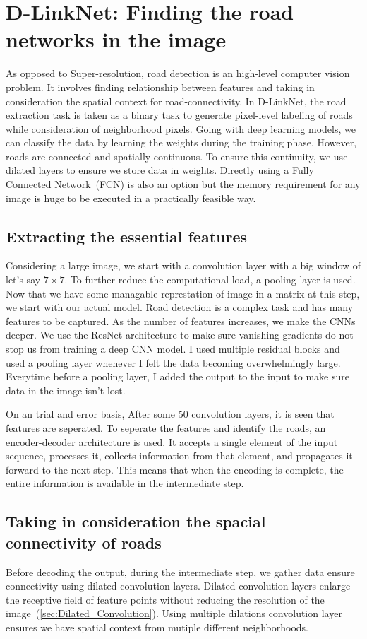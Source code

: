 \section{D-LinkNet: Finding the road networks in the image}
As opposed to Super-resolution, road detection is an high-level computer vision problem. It involves finding relationship between features and taking in consideration the spatial context for road-connectivity. In D-LinkNet, the road extraction task is taken as a binary task to generate pixel-level labeling of roads while consideration of neighborhood pixels. Going with deep learning models, we can classify the data by learning the weights during the training phase. However, roads are connected and spatially continuous. To ensure this continuity, we use dilated layers to ensure we store data in weights. Directly using a Fully Connected Network~(FCN) is also an option but the memory requirement for any image is huge to be executed in a practically feasible way.

\subsection{Extracting the essential features}
Considering a large image, we start with a convolution layer with a big window of let's say $7\times7$. To further reduce the computational load, a pooling layer is used. Now that we have some managable represtation of image in a matrix at this step, we start with our actual model. Road detection is a complex task and has many features to be captured. As the number of features increases, we make the CNNs deeper. We use the ResNet architecture to make sure vanishing gradients do not stop us from training a deep CNN model. I used multiple residual blocks and used a pooling layer whenever I felt the data becoming overwhelmingly large. Everytime before a pooling layer, I added the output to the input to make sure data in the image isn't lost.

On an trial and error basis, After some 50 convolution layers, it is seen that features are seperated. To seperate the features and identify the roads, an encoder-decoder architecture is used. It accepts a single element of the input sequence, processes it, collects information from that element, and propagates it forward to the next step. This means that when the encoding is complete, the entire information is available in the intermediate step.

\subsection{Taking in consideration the spacial connectivity of roads}
Before decoding the output, during the intermediate step, we gather data ensure connectivity using dilated convolution layers. Dilated convolution layers enlarge the receptive field of feature points without reducing the resolution of the image~(\ref{sec:Dilated_Convolution}). Using multiple dilations convolution layer ensures we have spatial context from mutiple different neighborhoods.

